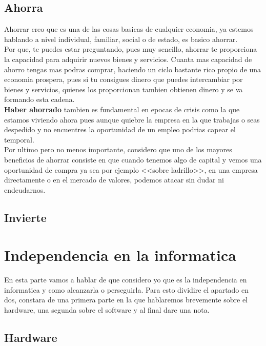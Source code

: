 \subsection{Ahorra}

Ahorrar creo que es una de las cosas basicas de cualquier economia, ya estemos hablando a nivel individual, familiar, social o de estado, es basico ahorrar.\\

Por que, te puedes estar preguntando, pues muy sencillo, ahorrar te proporciona la capacidad para adquirir nuevos bienes y servicios. Cuanta mas capacidad de ahorro tengas mas podras comprar, haciendo un ciclo bastante rico propio de una economia prospera, pues si tu consigues dinero que puedes intercambiar por bienes y servicios, quienes los proporcionan tambien obtienen dinero y se va formando esta cadena.\\

\textbf{Haber ahorrado} tambien es fundamental en epocas de crisis como la que estamos viviendo ahora pues aunque quiebre la empresa en la que trabajas o seas despedido y no encuentres la oportunidad de un empleo podrias capear el temporal.\\

Por ultimo pero no menos importante, considero que uno de los mayores beneficios de ahorrar consiste en que cuando tenemos algo de capital y vemos una oportunidad de compra ya sea por ejemplo <<sobre ladrillo>>, en una empresa directamente o en el mercado de valores, podemos atacar sin dudar ni endeudarnos.

\subsection{Invierte}

\section{Independencia en la informatica}

En esta parte vamos a hablar de que considero yo que es la independencia en informatica y como alcanzarla o perseguirla. Para esto dividire el apartado en dos, constara de una primera parte en la que hablaremos brevemente sobre el hardware, una segunda sobre el software y al final dare una nota.

\subsection{ Hardware }

